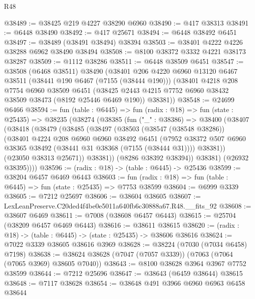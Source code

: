 \begin{lexlean}{R48}
\begin{coremodule}
@38489 := @38425 @219 @4227 @38290 @6960
@38490 := @417 @38313
@38491 := @6448 @38490
@38492 := @417 @25671
@38494 := @6448 @38492 @6451
@38497 := @38489 (@38491 @38494) @38394
@38503 := @38401 @4222 @4226 @38288 @6962 @38490 @38494
@38508 := @8100 @38372 @3332 @4221 @38173 @38287
@38509 := @1112 @38286
@38511 := @6448 @38509 @6451
@38547 := @38508
    (@6468 @38511)
    @38490
    (@38401
      @206
      @4220
      @6960
      @13120
      @6467
      @38511
      (@38441 @190 @6467 (@7155 (@38444 @190)))
      (@38401
        @4218
        @208
        @7754
        @6960
        @38509
        @6451
        (@38425 @2443 @4215 @7752 @6960 @38432 @38509 @38473 (@8192 @25446 @6469 @190))
        @38381))
@38548 := @24699 @6466
@38594 := fun (table : @6445) =>
  fun (radix : @18) =>
  fun (state : @25435) =>
  @38235
    (@38274
      (@38385
        (fun ("_" : @38386) =>
        @38400
          (@38407
            (@38418
              (@38479
                (@38485
                  (@38497
                    (@38503
                      (@38547 (@38548 @38286))
                      (@38401
                        @4224
                        @208
                        @6960
                        @6960
                        @38492
                        @6451
                        (@7952
                          @38372
                          @507
                          @6960
                          @38365
                          @38492
                          (@38441 @31 @38368 (@7155 (@38444 @31))))
                        @38381))
                    (@23050 @38313 @25671))
                  @38381))
              (@8286 @38392 @38394))
            @38381)
          (@26932 @38395))))
@38596 := (radix : @18) -> (table : @6445) -> @25436
@38599 := @38204 @6457 @6469 @6443
@38603 := fun (radix : @18) => fun (table : @6445) => fun (state : @25435) => @7753 @38599
@38604 := @6999 @3339
@38605 := @7212 @25697
@38606 := @38604 @38605
@38607 := LexLeanPreserve.C20ded4f4be0e5011a640fb6c30888a67.R48.__fits_92
@38608 := @38607 @6469
@38611 := @7008 (@38608 @6457 @6443)
@38615 := @25704 (@38209 @6457 @6469 @6443)
@38616 := @38611 @38615
@38620 := (radix : @18) -> (table : @6445) -> (state : @25435) -> @38606 @38616
@38624 := @7022 @3339 @38605 @38616 @3969
@38628 := @38224 (@7030 (@7034 @6458) @7198)
@38638 := @38624 @38628 (@7047 (@7057 @3339)) (@7063 (@7064 (@7065 @3969) @38605 @7040))
@38643 := @8100 @38628 @3964 @3967 @7752 @38599
@38644 := @7212 @25696
@38647 := @38643 (@6459 @38644) @38615
@38648 := @7117 @38628
@38654 := @38648 @491 @3966 @6960 @6963 @6458 @38644

\end{coremodule}
\end{lexlean}
